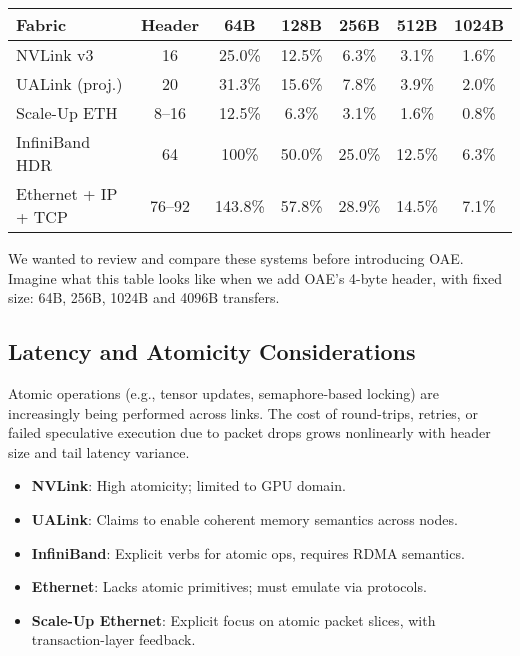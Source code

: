 \begin{table}[h]
\centering
\begin{tabular}{@{}lcccccc@{}}
\toprule
\textbf{Fabric} & \textbf{Header} & \textbf{64B} & \textbf{128B} & \textbf{256B} & \textbf{512B} & \textbf{1024B} \\
\midrule
NVLink v3       & 16     & 25.0\% & 12.5\% & 6.3\% & 3.1\% & 1.6\% \\
UALink (proj.)  & 20     & 31.3\% & 15.6\% & 7.8\% & 3.9\% & 2.0\% \\
Scale-Up ETH    & 8–16   & 12.5\% & 6.3\% & 3.1\% & 1.6\% & 0.8\% \\
InfiniBand HDR  & 64     & 100\%  & 50.0\% & 25.0\% & 12.5\% & 6.3\% \\
Ethernet + IP + TCP & 76–92  & 143.8\% & 57.8\% & 28.9\% & 14.5\% & 7.1\% \\
\bottomrule
\end{tabular}
\label{tab:header-overhead}
\end{table}

\begin{highlightbox}
We wanted to  review and compare  these systems  before introducing OAE. Imagine what this table looks like when we add OAE's 4-byte header,  with fixed size: 64B, 256B, 1024B and 4096B  transfers.%
\end{highlightbox}


\subsection{Latency and Atomicity Considerations}

Atomic operations (e.g., tensor updates, semaphore-based locking) are increasingly being performed across links. The cost of round-trips, retries, or failed speculative execution due to packet drops grows nonlinearly with header size and tail latency variance.

\begin{itemize}
  \item \textbf{NVLink}: High atomicity; limited to GPU domain.
  \item \textbf{UALink}: Claims to enable coherent memory semantics across nodes.
  \item \textbf{InfiniBand}: Explicit verbs for atomic ops, requires RDMA semantics.
  \item \textbf{Ethernet}: Lacks atomic primitives; must emulate via protocols.
  \item \textbf{Scale-Up Ethernet}: Explicit focus on atomic packet slices, with transaction-layer feedback.
\end{itemize}

